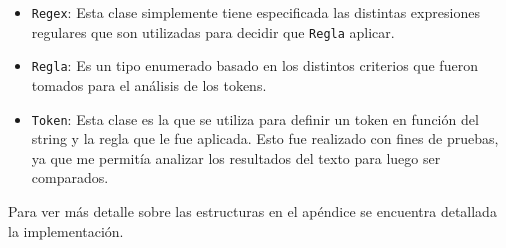 \begin{itemize}
\begin{itemize}
		\end{itemize}
		\item \texttt{Regex}: Esta clase simplemente tiene especificada las distintas expresiones regulares que son utilizadas para decidir que \texttt{Regla} aplicar. 
		\item \texttt{Regla}: Es un tipo enumerado basado en los distintos criterios que fueron tomados para el an\'alisis de los tokens. 
		\item \texttt{Token}: Esta clase es la que se utiliza para definir un token en funci\'on del string y la regla que le fue aplicada. Esto fue realizado con fines de pruebas, ya que me permit\'ia analizar los resultados del texto para luego ser comparados. 
\end{itemize}

Para ver m\'as detalle sobre las estructuras en el ap\'endice se encuentra detallada la implementaci\'on.
